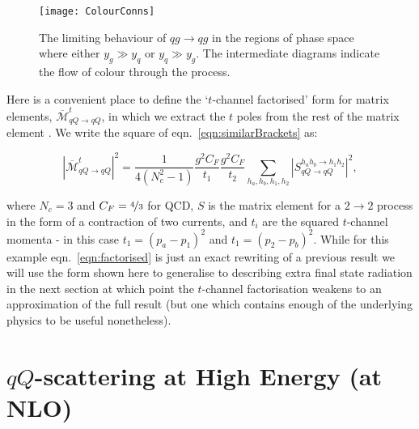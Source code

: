 		\begin{figure}
			\begin{center}
			\texttt{[image: ColourConns]}
			\caption{The limiting behaviour of $qg\to qg$ in the regions of phase space where
			either $y_g\gg y_q$ or $y_q\gg y_g$.  The intermediate diagrams indicate the flow
			of colour through the process.}
			\label{fig:colorConns}
			\end{center}
		\end{figure}

		Here is a convenient place to define the `$t$-channel factorised' form for matrix elements,
		$\overline{\mathcal{M}}^t_{qQ\rightarrow qQ}$, in which we extract the $t$ poles from the
		rest of the matrix element \cite{Andersen:2009nu}.  We write the square of
		eqn.~\eqref{eqn:similarBrackets} as:

		\begin{equation}
			|\overline{\mathcal{M}}^t_{qQ\rightarrow qQ}|^2 = \frac{1}{4(N_c^2-1)}
			\frac{g^2C_F}{t_1}\frac{g^2C_F}{t_2} \sum_{h_a, h_b, h_1, h_2}
			|S_{qQ\rightarrow qQ}^{h_ah_b\rightarrow h_1h_2}|^2,
			\label{eqn:factorised}
		\end{equation}

		where $N_c=3$ and $C_F=\nicefrac{4}{3}$ for QCD, $S$ is the matrix element for a $2\rightarrow2$ process
		in the form of a contraction of two currents, and $t_i$ are the squared $t$-channel momenta - in this
		case $t_1=(p_a-p_1)^2$ and $t_1=(p_2-p_b)^2$.  While for this example eqn.~\eqref{eqn:factorised} is
		just an exact rewriting of a previous result we will use the form shown here to generalise to describing
		extra final state radiation in the next section at which point the $t$-channel factorisation weakens to
		an approximation of the full result (but one which contains enough of the underlying physics to be useful
		nonetheless).

	\section{$qQ$-scattering at High Energy (at NLO)}
		\label{sub:HE22_NLO}

